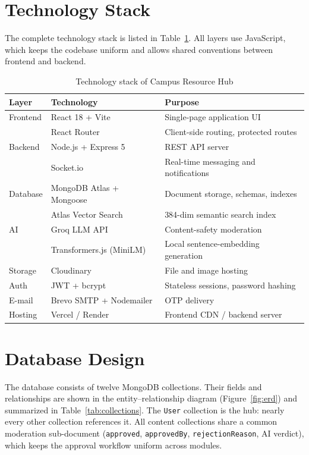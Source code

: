 \documentclass[12pt,a4paper]{report}
\begin{document}
\section{Technology Stack}
The complete technology stack is listed in Table~\ref{tab:stack}.
All layers use JavaScript, which keeps the codebase uniform and
allows shared conventions between frontend and backend.
\begin{table}[htbp]
\centering
\caption{Technology stack of Campus Resource Hub}
\label{tab:stack}
\begin{tabular}{@{}llp{6.4cm}@{}}
\toprule
\textbf{Layer} & \textbf{Technology} & \textbf{Purpose} \\
\midrule
Frontend & React 18 + Vite & Single-page application UI \\
         & React Router & Client-side routing, protected routes \\
Backend  & Node.js + Express 5 & REST API server \\
         & Socket.io & Real-time messaging and notifications \\
Database & MongoDB Atlas + Mongoose & Document storage, schemas,
           indexes \\
         & Atlas Vector Search & 384-dim semantic search index \\
AI       & Groq LLM API & Content-safety moderation \\
         & Transformers.js (MiniLM) & Local sentence-embedding
           generation \\
Storage  & Cloudinary & File and image hosting \\
Auth     & JWT + bcrypt & Stateless sessions, password hashing \\
E-mail   & Brevo SMTP + Nodemailer & OTP delivery \\
Hosting  & Vercel / Render & Frontend CDN / backend server \\
\bottomrule
\end{tabular}
\end{table}

\section{Database Design}
The database consists of twelve MongoDB collections. Their fields
and relationships are shown in the entity--relationship diagram
(Figure~\ref{fig:erd}) and summarized in
Table~\ref{tab:collections}. The \texttt{User} collection is the
hub: nearly every other collection references it. All content
collections share a common moderation sub-document
(\texttt{approved}, \texttt{approvedBy}, \texttt{rejectionReason},
AI verdict), which keeps the approval workflow uniform across
modules.
\end{document}
